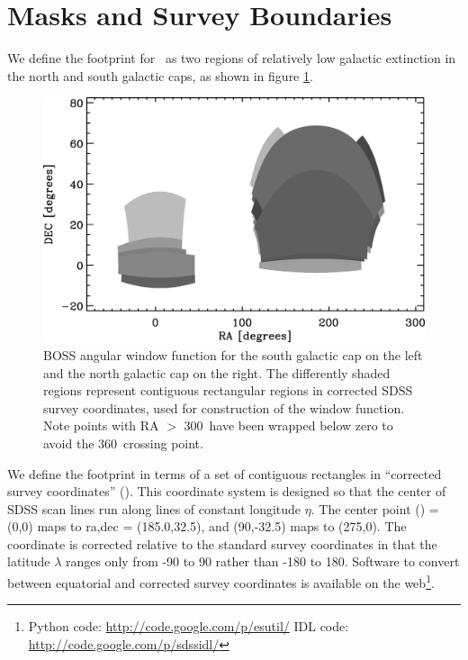 \documentclass[12pt,preprint]{aastex}
\begin{document}
\section{Masks and Survey Boundaries} \label{sec:masks}

We define the footprint for \boss\ as two regions of relatively low galactic
extinction in the north and south galactic caps, as shown in figure
\ref{fig:footprint}.  

\begin{figure}[t] \centering
 \centering 
 \includegraphics[scale=0.6]{fig/boss-poly-coverage.eps}

 \caption{BOSS angular window function for the south galactic cap on the left
 and the north galactic cap on the right.  The differently shaded regions
 represent contiguous rectangular regions in corrected SDSS survey coordinates,
 used for construction of the window function.  Note points with RA $>$
 300\arcdeg\ have been wrapped below zero to avoid the 360\arcdeg\ crossing
 point.} \label{fig:footprint}

\end{figure}

We define the footprint in terms of a set of contiguous rectangles in
``corrected survey coordinates'' (\etalambda).  This coordinate system is
designed so that the center of SDSS scan lines run along lines of constant
longitude $\eta$.  The center point (\etalambda) = (0,0) maps to ra,dec =
(185.0,32.5), and (90,-32.5) maps to (275,0).  The coordinate is corrected
relative to the standard survey coordinates \citep{edr} in that the latitude
$\lambda$ ranges only from -90 to 90 rather than -180 to 180.  Software to
convert between equatorial and corrected survey coordinates is available on the
web\footnote{Python code: \url{http://code.google.com/p/esutil/} IDL code:
\url{http://code.google.com/p/sdssidl/}}.
\end{document}
